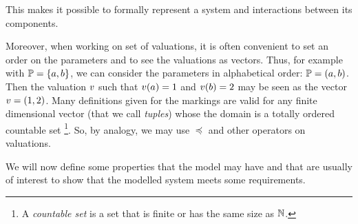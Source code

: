 This makes it possible to formally represent a system and interactions between its components.

Moreover, when working on set of valuations, it is often convenient to set an order on the parameters and to see the valuations as vectors.
Thus, for example with $\mathbb{P} = \{a, b\}$, we can consider the parameters in alphabetical order: $\mathbb{P} = (a, b)$.
Then the valuation $\val$ such that $\val(a) = 1$ and $\val(b) = 2$ may be seen as the vector $\val = (1,2)$.
Many definitions given for the markings are valid for any finite dimensional vector (that we call \emph{tuples}) whose the domain is a totally ordered countable set%
\footnote{A \emph{countable set} is a set that is finite or has the same size as $\mathbb{N}$.}.
So, by analogy, we may use $\preceq$ and other operators on valuations.

We will now define some properties that the model may have and that are usually of interest to show that the modelled system meets some requirements.
